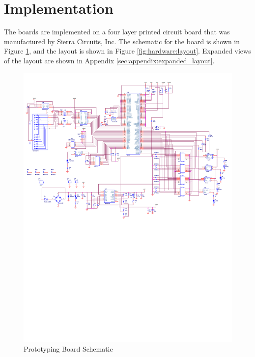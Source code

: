 \section{Implementation}\label{sec:hardware:implementation}

The boards are implemented on a four layer printed circuit board that was manufactured by Sierra Circuits, Inc. The schematic for the board is shown in Figure \ref{fig:hardware:schematic}, and the layout is shown in Figure \ref{fig:hardware:layout}. Expanded views of the layout are shown in Appendix \ref{sec:appendix:expanded_layout}.

\begin{landscape}
	\begin{figure}[ptb]
		\begin{centering}
			\includegraphics[width=8.25in]{Hardware/Figures/hardware-schematic.pdf}
			\caption{Prototyping Board Schematic}
			\label{fig:hardware:schematic}
		\end{centering}
	\end{figure}
\end{landscape}

